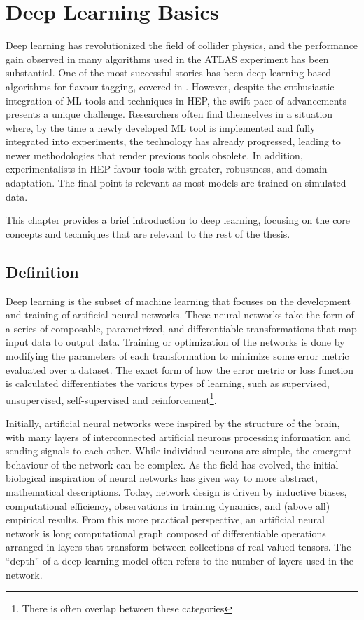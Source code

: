 \chapter{Deep Learning Basics}
\label{ch:deep_learning}

Deep learning has revolutionized the field of collider physics, and the performance gain observed in many algorithms used in the \Gls{ATLAS} experiment has been substantial.
One of the most successful stories has been deep learning based algorithms for flavour tagging, covered in .
However, despite the enthusiastic integration of \Gls{ML} tools and techniques in \Gls{HEP}, the swift pace of advancements presents a unique challenge.
Researchers often find themselves in a situation where, by the time a newly developed \Gls{ML} tool is implemented and fully integrated into experiments, the technology has already progressed, leading to newer methodologies that render previous tools obsolete.
In addition, experimentalists in \Gls{HEP} favour tools with greater, robustness, and domain adaptation.
The final point is relevant as most models are trained on simulated data.

This chapter provides a brief introduction to deep learning, focusing on the core concepts and techniques that are relevant to the rest of the thesis.

\section{Definition}

Deep learning is the subset of machine learning that focuses on the development and training of artificial neural networks.
These neural networks take the form of a series of composable, parametrized, and differentiable transformations that map input data to output data.
Training or optimization of the networks is done by modifying the parameters of each transformation to minimize some error metric evaluated over a dataset.
The exact form of how the error metric or loss function is calculated differentiates the various types of learning, such as supervised, unsupervised, self-supervised and reinforcement\footnote{There is often overlap between these categories}.

Initially, artificial neural networks were inspired by the structure of the brain, with many layers of interconnected artificial neurons processing information and sending signals to each other.
While individual neurons are simple, the emergent behaviour of the network can be complex.
As the field has evolved, the initial biological inspiration of neural networks has given way to more abstract, mathematical descriptions.
Today, network design is driven by inductive biases, computational efficiency, observations in training dynamics, and (above all) empirical results.
From this more practical perspective, an artificial neural network is long computational graph composed of differentiable operations arranged in layers that transform between collections of real-valued tensors.
The ``depth'' of a deep learning model often refers to the number of layers used in the network.

